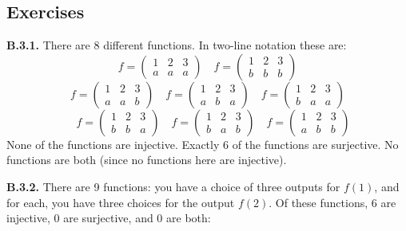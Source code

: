 \documentclass[10pt,]{book}
\theoremstyle{plain}
\theoremstyle{definition}
\theoremstyle{definition}
\theoremstyle{definition}
\theoremstyle{definition}
\numberwithin{equation}{chapter}
\newcommand{\amp}{&}
\begin{document}
\subsection*{ Exercises}
\noindent\textbf{B.3.1.} \hypertarget{p-1679}{}%
There are 8 different functions. In two-line notation these are:%
\begin{equation*}
f = \begin{pmatrix} 1 \amp 2 \amp 3 \\ a \amp a\amp a \end{pmatrix} \quad f = \begin{pmatrix} 1 \amp 2 \amp 3 \\ b \amp b \amp b \end{pmatrix}
\end{equation*}
%
\begin{equation*}
f = \begin{pmatrix} 1 \amp 2 \amp 3 \\ a \amp a\amp b \end{pmatrix} \quad f = \begin{pmatrix} 1 \amp 2 \amp 3 \\ a \amp b \amp a \end{pmatrix} \quad f = \begin{pmatrix} 1 \amp 2 \amp 3 \\ b \amp a\amp a \end{pmatrix}
\end{equation*}
%
\begin{equation*}
\quad f = \begin{pmatrix} 1 \amp 2 \amp 3 \\ b \amp b \amp a \end{pmatrix} \quad f = \begin{pmatrix} 1 \amp 2 \amp 3 \\ b \amp a\amp b \end{pmatrix} \quad f = \begin{pmatrix} 1 \amp 2 \amp 3 \\ a \amp b \amp b \end{pmatrix} 
\end{equation*}
None of the functions are injective. Exactly 6 of the functions are surjective. No functions are both (since no functions here are injective).%
\par\smallskip
\noindent\textbf{B.3.2.} \hypertarget{p-1681}{}%
There are 9 functions: you have a choice of three outputs for \(f(1)\), and for each, you have three choices for the output \(f(2)\). Of these functions, 6 are injective, 0 are surjective, and 0 are both:%
\end{document}
